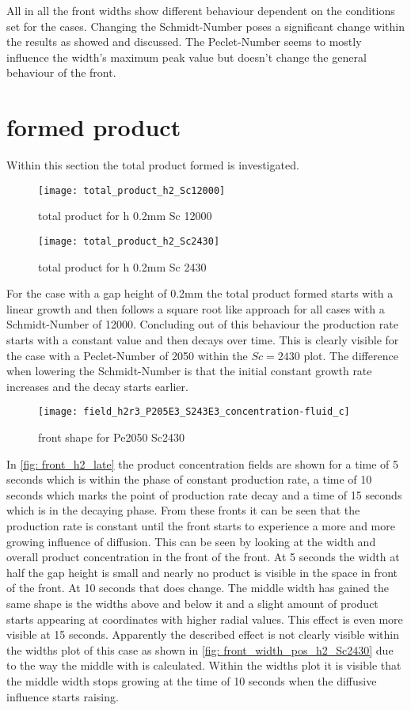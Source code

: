 \documentclass[../thesis.tex]{subfiles}
\begin{document}
All in all the front widths show different behaviour dependent on the conditions set for the cases. Changing the Schmidt-Number poses a significant change within the results as showed and discussed. The Peclet-Number seems to mostly influence the width's maximum peak value but doesn't change the general behaviour of the front.

\section{formed product}

Within this section the total product formed is investigated.

\begin{figure}[htbp]
	\centering
	\texttt{[image: total\_product\_h2\_Sc12000]}
	\caption{total product for h 0.2mm Sc 12000\label{fig: total_prod_h2_Sc12000}}\bigskip
	\texttt{[image: total\_product\_h2\_Sc2430]}
	\caption{total product for h 0.2mm Sc 2430\label{fig: total_prod_h2_Sc2430}}
\end{figure}

For the case with a gap height of 0.2mm the total product formed starts with a linear growth and then follows a square root like approach for all cases with a Schmidt-Number of 12000. Concluding out of this behaviour the production rate starts with a constant value and then decays over time. This is clearly visible for the case with a Peclet-Number of 2050 within the $Sc = 2430$ plot. The difference when lowering the Schmidt-Number is that the initial constant growth rate increases and the decay starts earlier.
\begin{figure}[htb]
	\centering
	\texttt{[image: field\_h2r3\_P205E3\_S243E3\_concentration-fluid\_c]}
	\caption{front shape for Pe2050 Sc2430}
	\label{fig: front_h2_late}
\end{figure}
In \autoref{fig: front_h2_late} the product concentration fields are shown for a time of 5 seconds which is within the phase of constant production rate, a time of 10 seconds which marks the point of production rate decay and a time of 15 seconds which is in the decaying phase. From these fronts it can be seen that the production rate is constant until the front starts to experience a more and more growing influence of diffusion. This can be seen by looking at the width and overall product concentration in the front of the front. At 5 seconds the width at half the gap height is small and nearly no product is visible in the space in front of the front. At 10 seconds that does change. The middle width has gained the same shape is the widths above and below it and a slight amount of product starts appearing at coordinates with higher radial values. This effect is even more visible at 15 seconds. Apparently the described effect is not clearly visible within the widths plot of this case as shown in \autoref{fig: front_width_pos_h2_Sc2430} due to the way the middle with is calculated. Within the widths plot it is visible that the middle width stops growing at the time of 10 seconds when the diffusive influence starts raising. 
\end{document}
